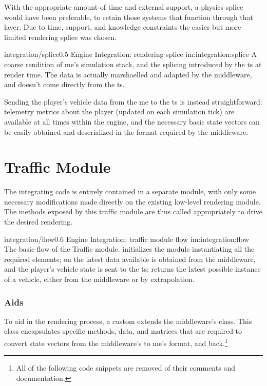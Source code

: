 With the appropriate amount of time and external support, a physics splice would have been preferable, to retain those systems that function through that layer. Due to time, support, and knowledge constraints the easier but more limited rendering splice was chosen.

\begin{image}
	{integration/splice}{0.5}
	{Engine Integration: rendering splice}
	{im:integration:splice}
	{}
	{A coarse rendition of \gls{me}'s simulation stack, and the splicing introduced by the \gls{ts} at render time. The data is actually marshaelled and adapted by the \gls{middleware}, and doesn't come directly from the \gls{ts}.}
\end{image}

Sending the player's vehicle data from the \gls{me} to the \gls{ts} is instead straightforward: telemetry metrics about the player (updated on each simulation tick) are available at all times within the engine, and the necessary basic state vectors can be easily obtained and deserialized in the format required by the \gls{middleware}.

\section{Traffic Module}\label{sc:integration:trafficmodule}

The integrating code is entirely contained in a separate module, with only some necessary modifications made directly on the existing low-level rendering module. The methods exposed by this traffic module are thus called appropriately to drive the desired rendering.

\begin{image}
	{integration/flow}{0.6}
	{Engine Integration: traffic module flow}
	{im:integration:flow}
	{}
	{The basic flow of the Traffic module.  initializes the module instantiating all the required elements; on  the latest data available is obtained from the \gls{middleware}, and the player's vehicle state is sent to the \gls{ts};  returns the latest possible instance of a vehicle, either from the \gls{middleware} or by extrapolation.}
\end{image}

\subsubsection{Aids}

To aid in the rendering process, a custom  extends the \gls{middleware}'s  class. This class encapsulates specific methods, data, and matrices that are required to convert state vectors from the \gls{middleware}'s to \gls{me}'s format, and back.\footnote{All of the following code snippets are removed of their comments and documentation.}

